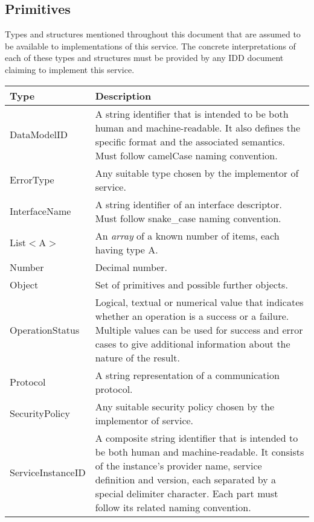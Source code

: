\documentclass[a4paper]{arrowhead}
\newcommand{\pdef}[1]{{\textcolor{ArrowheadGrey}{#1\label{sec:model:primitives:#1}\label{sec:model:primitives:#1s}\label{sec:model:primitives:#1es}}}}
\begin{document}
\clearpage

\subsection{Primitives}
\label{sec:model:primitives}

Types and structures mentioned throughout this document that are assumed to be available to implementations of this service.
The concrete interpretations of each of these types and structures must be provided by any IDD document claiming to implement this service.

\begin{table}[ht!]
\begin{tabularx}{\textwidth}{| p{3.7cm} | X |} \hline
\rowcolor{gray!33} Type & Description \\ \hline
\pdef{DataModelID}      & A string identifier that is intended to be both human and machine-readable. It also defines the specific format and the associated semantics. Must follow camelCase naming convention. \\ \hline
\pdef{ErrorType}        & Any suitable type chosen by the implementor of service. \\ \hline
\pdef{InterfaceName}    & A string identifier of an interface descriptor. Must follow snake\_case naming convention. \\ \hline
\pdef{List}$<$A$>$      & An \textit{array} of a known number of items, each having type A. \\ \hline
\pdef{Number}           & Decimal number. \\ \hline
\pdef{Object}           & Set of primitives and possible further objects. \\ \hline
\pdef{OperationStatus}  & Logical, textual or numerical value that indicates whether an operation is a success or a failure. Multiple values can be used for success and error cases to give additional information about the nature of the result. \\ \hline
\pdef{Protocol}         & A string representation of a communication protocol. \\ \hline
\pdef{SecurityPolicy}   & Any suitable security policy chosen by the implementor of service. \\ \hline
\pdef{ServiceInstanceID} & A composite string identifier that is intended to be both human and machine-readable. It consists of the instance's provider name, service definition and version, each separated by a special delimiter character. Each part must follow its related naming convention. \\ \hline

\end{tabularx}
\end{table}
\end{document}
